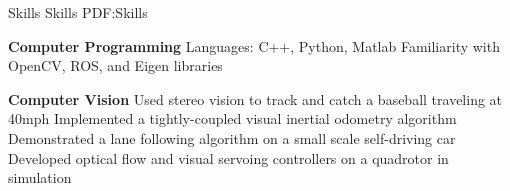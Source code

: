 \documentclass[letterpaper,MMMyyyy,nonstopmode]{simpleresumecv}
\begin{document}
\begin{Body}

















\Section
{Skills}
{Skills}
{PDF:Skills}

\Entry
{\textbf{Computer Programming}}
\Gap
\BulletItem
Languages: C++, Python, Matlab
\BulletItem 
Familiarity with OpenCV, ROS, and Eigen libraries


\Gap 
\Entry 
{\textbf{Computer Vision}}
\Gap 
\BulletItem
Used stereo vision to track and catch a baseball traveling at  40mph
\BulletItem
Implemented a tightly-coupled visual inertial odometry algorithm
\BulletItem 
Demonstrated a lane following algorithm on a small scale self-driving car
\BulletItem 
Developed optical flow and visual servoing controllers on a quadrotor in simulation


\end{Body}
\end{document}

